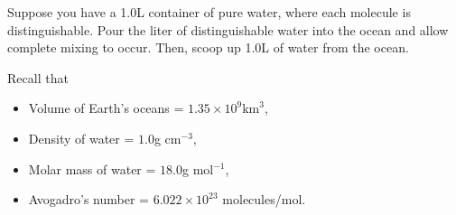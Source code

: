 \documentclass[12pt]{article}
\newenvironment{problem}[2][Problem]{\begin{trivlist}
    \item[\hskip \labelsep {\bfseries #1}\hskip \labelsep {\bfseries #2.}]}{\end{trivlist}}
\theoremstyle{definition}
\begin{document}
\begin{problem}{1}
  Suppose you have a 1.0L container of pure water, where each molecule is distinguishable.
  Pour the liter of distinguishable water into the ocean and allow complete mixing to occur.
  Then, scoop up 1.0L of water from the ocean.

  Recall that
  \begin{itemize}
    \item Volume of Earth's oceans = \( 1.35 \times 10^9 \text{km}^3 \),
    \item Density of water = \( 1.0 \)g cm\(^{-3} \),
    \item Molar mass of water = \( 18.0 \)g mol\(^{-1}\),
          \item Avogadro's number = \( 6.022 \times 10^{23} \) molecules/mol.
  \end{itemize}


\end{problem}
\end{document}
